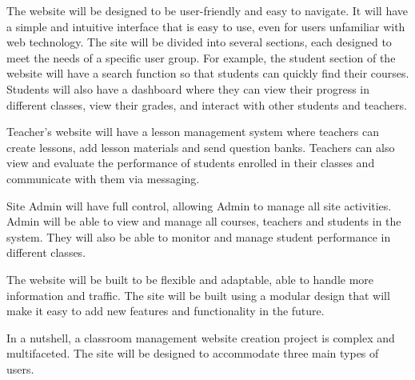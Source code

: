 The website will be designed to be user-friendly and easy to navigate. It will have a simple and intuitive interface that is easy to use, even for users unfamiliar with web technology. The site will be divided into several sections, each designed to meet the needs of a specific user group.
For example, the student section of the website will have a search function so that students can quickly find their courses. Students will also have a dashboard where they can view their progress in different classes, view their grades, and interact with other students and teachers.

Teacher's website will have a lesson management system where teachers can create lessons, add lesson materials and send question banks. Teachers can also view and evaluate the performance of students enrolled in their classes and communicate with them via messaging.

Site Admin will have full control, allowing Admin to manage all site activities.
Admin will be able to view and manage all courses, teachers and students in the system. They will also be able to monitor and manage student performance in different classes.

The website will be built to be flexible and adaptable, able to handle more information and traffic. The site will be built using a modular design that will make it easy to add new features and functionality in the future.

In a nutshell, a classroom management website creation project is complex and multifaceted.
The site will be designed to accommodate three main types of users.
\clearpage